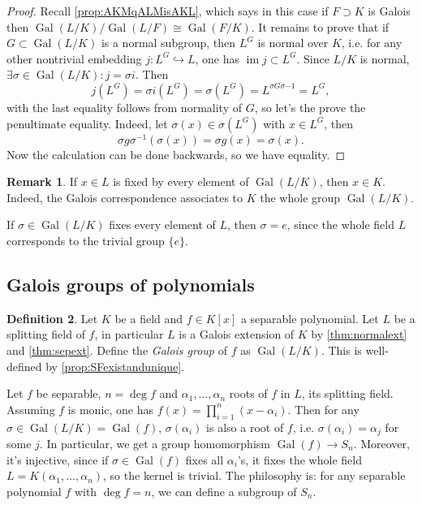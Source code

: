 \documentclass{article}
\newcommand{\im}{\operatorname{im}}
\newcommand{\Gal}{\operatorname{Gal}}
\theoremstyle{definition}
\newtheorem{defn}{Definition}[subsection]
\newtheorem{remark}[defn]{Remark}
\begin{document}
\begin{proof}
Recall \ref{prop:AKMqALMisAKL}, which says in this case if $F\supset K$ is Galois then $\Gal(L/K)/\Gal(L/F)\cong\Gal(F/K)$. It remains to prove that if $G\subset\Gal(L/K)$ is a normal subgroup, then $L^G$ is normal over $K$, i.e. for any other nontrivial embedding $j:L^G\hookrightarrow L$, one has $\im j\subset L^G$. Since $L/K$ is normal, $\exists\sigma\in\Gal(L/K):j=\sigma i$. Then
\[
j(L^G)=\sigma i(L^G)=\sigma(L^G)=L^{\sigma G\sigma{-1}}=L^G,
\]
with the last equality follows from normality of $G$, so let's the prove the penultimate equality. Indeed, let $\sigma(x)\in\sigma(L^G)$ with $x\in L^G$, then
\[
\sigma g\sigma^{-1}(\sigma(x))=\sigma g(x)=\sigma(x).
\]
Now the calculation can be done backwards, so we have equality.
\end{proof}

\begin{remark}
\label{remark:afterFundamental}
If $x\in L$ is fixed by every element of $\Gal(L/K)$, then $x\in K$. Indeed, the Galois correspondence associates to $K$ the whole group $\Gal(L/K)$.

If $\sigma\in\Gal(L/K)$ fixes every element of $L$, then $\sigma=e$, since the whole field $L$ corresponds to the trivial group $\{e\}$.
\end{remark}

\subsection{Galois groups of polynomials}
\begin{defn}
Let $K$ be a field and $f\in K[x]$ a separable polynomial. Let $L$ be a splitting field of $f$, in particular $L$ is a Galois extension of $K$ by \ref{thm:normalext} and \ref{thm:sepext}. Define the \textit{Galois group} of $f$ as $\Gal(L/K)$. This is well-defined by \ref{prop:SFexistandunique}.
\end{defn}

Let $f$ be separable, $n=\deg f$ and $\alpha_1,\ldots,\alpha_n$ roots of $f$ in $L$, its splitting field. Assuming $f$ is monic, one has $f(x)=\prod_{i=1}^n(x-\alpha_i)$. Then for any $\sigma\in\Gal(L/K)=\Gal(f)$, $\sigma(\alpha_i)$ is also a root of $f$, i.e. $\sigma(\alpha_i)=\alpha_j$ for some $j$. In particular, we get a group homomorphism $\Gal(f)\rightarrow S_n$. Moreover, it's injective, since if $\sigma\in\Gal(f)$ fixes all $\alpha_i$'s, it fixes the whole field $L=K(\alpha_1,\ldots,\alpha_n)$, so the kernel is trivial. The philosophy is: for any separable polynomial $f$ with $\deg f=n$, we can define a subgroup of $S_n$.
\end{document}
